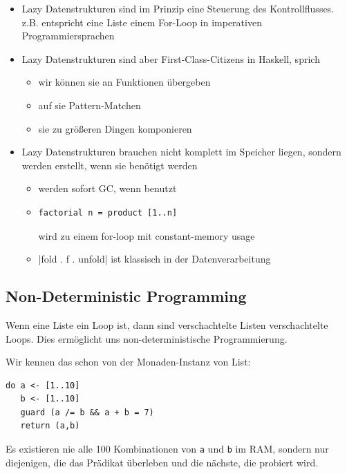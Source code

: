 \documentclass{beamer}
\begin{document}
\begin{frame}[fragile]
\begin{itemize}
 \item Lazy Datenstrukturen sind im Prinzip eine Steuerung des Kontrollflusses.\\\pause
       z.B. entspricht eine Liste einem For-Loop in imperativen Programmiersprachen
 \pause
 \item Lazy Datenstrukturen sind aber First-Class-Citizens in Haskell, sprich\\\pause
       \begin{itemize}
        \item wir können sie an Funktionen übergeben
        \pause
        \item auf sie Pattern-Matchen
        \pause
        \item sie zu größeren Dingen komponieren
       \end{itemize}
 \pause
 \item Lazy Datenstrukturen brauchen nicht komplett im Speicher liegen, sondern werden erstellt, wenn sie benötigt werden\\\pause
       \begin{itemize}
        \item werden sofort GC, wenn benutzt
        \pause
        \item \begin{verbatim}
factorial n = product [1..n]
              \end{verbatim}
              wird zu einem for-loop mit constant-memory usage
        \pause
        \item {}|fold . f . unfold|
              ist klassisch in der Datenverarbeitung

       \end{itemize}

\end{itemize}

\end{frame}

\subsection{Non-Deterministic Programming}

\begin{frame}[fragile]
Wenn eine Liste ein Loop ist, dann sind verschachtelte Listen verschachtelte Loops. Dies ermöglicht uns non-deterministische Programmierung.\pause\smallskip\smallskip

Wir kennen das schon von der Monaden-Instanz von List:
\begin{verbatim}
do a <- [1..10]
   b <- [1..10]
   guard (a /= b && a + b = 7)
   return (a,b)
\end{verbatim}

Es existieren nie alle 100 Kombinationen von \texttt{a} und \texttt{b} im RAM, sondern nur diejenigen, die das Prädikat überleben und die nächste, die probiert wird.
\end{frame}
\end{document}
